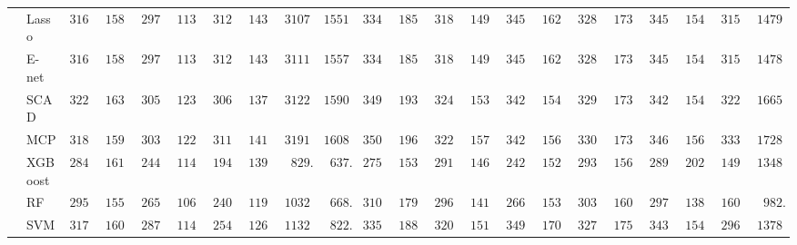 \begin{tabular}{p{0.2cm}p{1cm}|p{0.6cm}p{0.6cm}|p{0.6cm}p{0.6cm}p{0.6cm}p{0.6cm}p{0.6cm}p{0.6cm}|p{0.6cm}p{0.6cm}p{0.6cm}p{0.6cm}p{0.6cm}p{0.6cm}|p{0.6cm}p{0.6cm}p{0.6cm}p{0.6cm}p{0.6cm}p{0.6cm}}
 & Lasso  & $3161.45$ & $1581.05$ & $2975.47$ & $1136.57$ & $3122.67$ & $1435.69$ & $3107.47$ & $1551.61$ & $3346.18$ & $1853.53$ & $3188.95$ & $1497.14$ & $3453.56$ & $1623.46$ & $3284.44$ & $1734.65$ & $3453.57$ & $1541.20$ & $3157.81$ & $1479.73$ \\
 & E-net  & $3161.64$ & $1580.99$ & $2972.68$ & $1135.87$ & $3123.16$ & $1436.00$ & $3111.79$ & $1557.54$ & $3347.47$ & $1853.02$ & $3187.51$ & $1496.30$ & $3455.51$ & $1627.47$ & $3285.39$ & $1733.96$ & $3450.40$ & $1543.86$ & $3157.80$ & $1478.02$ \\
 & SCAD  & $3224.52$ & $1631.18$ & $3050.92$ & $1237.75$ & $3066.71$ & $1373.85$ & $3122.84$ & $1590.92$ & $3499.15$ & $1931.62$ & $3244.93$ & $1537.01$ & $3427.21$ & $1544.75$ & $3294.07$ & $1730.88$ & $3426.82$ & $1541.69$ & $3222.48$ & $1665.21$ \\
 & MCP  & $3188.01$ & $1592.86$ & $3039.49$ & $1222.96$ & $3115.90$ & $1410.48$ & $3191.00$ & $1608.55$ & $3506.72$ & $1966.68$ & $3228.99$ & $1577.52$ & $3428.71$ & $1566.27$ & $3309.53$ & $1735.73$ & $3460.21$ & $1569.71$ & $3336.00$ & $1728.81$ \\
 & XGBoost  & $2845.99$ & $1614.96$ & $2444.29$ & $1142.57$ & $1945.23$ & $1390.77$ & $\phantom{0}829.71$ & $\phantom{0}637.82$ & $2751.56$ & $1539.94$ & $2913.11$ & $1466.27$ & $2426.51$ & $1529.11$ & $2932.59$ & $1561.86$ & $2891.76$ & $2028.38$ & $1494.57$ & $1348.33$ \\
 & RF  & $2958.06$ & $1550.83$ & $2659.94$ & $1066.64$ & $2400.91$ & $1193.17$ & $1032.01$ & $\phantom{0}668.38$ & $3101.20$ & $1793.24$ & $2969.93$ & $1414.42$ & $2668.81$ & $1534.78$ & $3036.09$ & $1600.36$ & $2977.22$ & $1384.81$ & $1607.95$ & $\phantom{0}982.46$ \\
 & SVM  & $3170.45$ & $1604.25$ & $2877.11$ & $1144.59$ & $2540.77$ & $1262.32$ & $1132.02$ & $\phantom{0}822.15$ & $3353.56$ & $1887.85$ & $3204.39$ & $1517.47$ & $3499.77$ & $1701.79$ & $3275.51$ & $1756.74$ & $3430.75$ & $1544.96$ & $2961.02$ & $1378.05$ \\
\hline 
\end{tabular}

